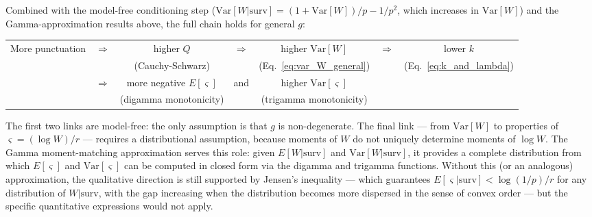  Combined with the model-free conditioning step ($\text{Var}[W|\text{surv}] = (1 + \text{Var}[W])/p - 1/p^2$, which increases in $\text{Var}[W]$) and the Gamma-approximation results above, the full chain holds for general $g$:
\begin{center}
\begin{tabular}{ccccccc}
	More punctuation & $\Rightarrow$ & higher $Q$ & $\Rightarrow$ & higher $\text{Var}[W]$ & $\Rightarrow$ & lower $k$ \\
	& & {\scriptsize (Cauchy-Schwarz)} & & {\scriptsize (Eq.~\ref{eq:var_W_general})} & & {\scriptsize (Eq.~\ref{eq:k_and_lambda})} \\[6pt]
	& $\Rightarrow$ & more negative $E[\varsigma]$ & and & higher $\text{Var}[\varsigma]$ \\
	& & {\scriptsize (digamma monotonicity)} & & {\scriptsize (trigamma monotonicity)} \\
\end{tabular}
\end{center}
The first two links are model-free: the only assumption is that $g$ is non-degenerate. The final link --- from $\text{Var}[W]$ to properties of $\varsigma = (\log W)/r$ --- requires a distributional assumption, because moments of $W$ do not uniquely determine moments of $\log W$. The Gamma moment-matching approximation serves this role: given $E[W|\text{surv}]$ and $\text{Var}[W|\text{surv}]$, it provides a complete distribution from which $E[\varsigma]$ and $\text{Var}[\varsigma]$ can be computed in closed form via the digamma and trigamma functions. Without this (or an analogous) approximation, the qualitative direction is still supported by Jensen's inequality --- which guarantees $E[\varsigma|\text{surv}] < \log(1/p)/r$ for any distribution of $W|\text{surv}$, with the gap increasing when the distribution becomes more dispersed in the sense of convex order --- but the specific quantitative expressions would not apply.












